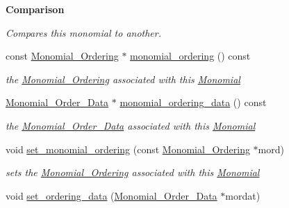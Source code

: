 \begin{Indent}\textbf{ Comparison}\par
{\em Compares this monomial to another. }\begin{DoxyCompactItemize}
\item 
\mbox{\label{group__polygroup_abd2698ed3860ba7132c01685d8efe03c}} 
const \hyperlink{group__orderinggroup_class_monomial___ordering}{Monomial\+\_\+\+Ordering} $\ast$ \hyperlink{group__polygroup_abd2698ed3860ba7132c01685d8efe03c}{monomial\+\_\+ordering} () const
\begin{DoxyCompactList}\small\item\em the \hyperlink{group__orderinggroup_class_monomial___ordering}{Monomial\+\_\+\+Ordering} associated with this \hyperlink{group__polygroup_class_monomial}{Monomial} \end{DoxyCompactList}\item 
\mbox{\label{group__polygroup_ac8f4e8a87c0c7170780525beea5acfb3}} 
\hyperlink{group__orderinggroup_class_monomial___order___data}{Monomial\+\_\+\+Order\+\_\+\+Data} $\ast$ \hyperlink{group__polygroup_ac8f4e8a87c0c7170780525beea5acfb3}{monomial\+\_\+ordering\+\_\+data} () const
\begin{DoxyCompactList}\small\item\em the \hyperlink{group__orderinggroup_class_monomial___order___data}{Monomial\+\_\+\+Order\+\_\+\+Data} associated with this \hyperlink{group__polygroup_class_monomial}{Monomial} \end{DoxyCompactList}\item 
\mbox{\label{group__polygroup_a78be0a586fdca4bedaaaf8006a57d90e}} 
void \hyperlink{group__polygroup_a78be0a586fdca4bedaaaf8006a57d90e}{set\+\_\+monomial\+\_\+ordering} (const \hyperlink{group__orderinggroup_class_monomial___ordering}{Monomial\+\_\+\+Ordering} $\ast$mord)
\begin{DoxyCompactList}\small\item\em sets the \hyperlink{group__orderinggroup_class_monomial___ordering}{Monomial\+\_\+\+Ordering} associated with this \hyperlink{group__polygroup_class_monomial}{Monomial} \end{DoxyCompactList}\item 
\mbox{\label{group__polygroup_afc14eaf6e15b94990b469e941d3c546d}} 
void \hyperlink{group__polygroup_afc14eaf6e15b94990b469e941d3c546d}{set\+\_\+ordering\+\_\+data} (\hyperlink{group__orderinggroup_class_monomial___order___data}{Monomial\+\_\+\+Order\+\_\+\+Data} $\ast$mordat)

\end{DoxyCompactItemize}
\end{Indent}
